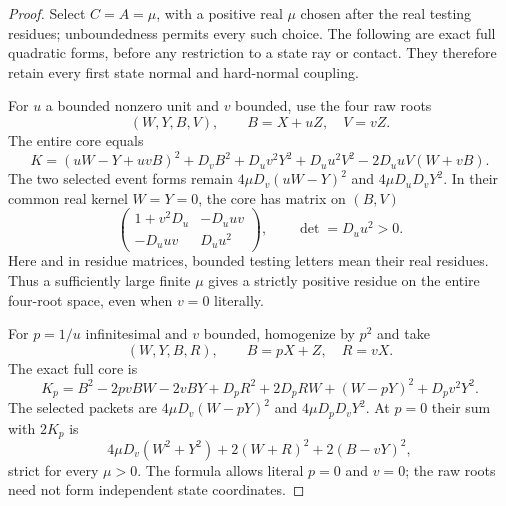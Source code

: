 \begin{proof}
Select $C=A=\mu$, with a positive real $\mu$ chosen after the real testing
residues; unboundedness permits every such choice. The following are exact
full quadratic forms, before any restriction to a state ray or contact.
They therefore retain every first state normal and hard-normal coupling.

For $u$ a bounded nonzero unit and $v$ bounded, use the four raw roots
\[
 (W,Y,B,V),\qquad B=X+uZ,\quad V=vZ.
\]
The entire core equals
\[
 K=(uW-Y+uvB)^2+D_vB^2+D_uv^2Y^2+D_uu^2V^2
       -2D_uuV(W+vB).                         \tag{CE2}
\]
The two selected event forms remain $4\mu D_v(uW-Y)^2$ and
$4\mu D_uD_vY^2$. In their common real kernel $W=Y=0$, the core has
matrix on $(B,V)$
\[
 \begin{pmatrix}1+v^2D_u&-D_uuv\\-D_uuv&D_uu^2\end{pmatrix},
 \qquad \det=D_uu^2>0.                       \tag{CE3}
\]
Here and in residue matrices, bounded testing letters mean their real
residues. Thus a sufficiently large finite $\mu$ gives a strictly positive
residue on the entire four-root space, even when $v=0$ literally.

For $p=1/u$ infinitesimal and $v$ bounded, homogenize by $p^2$ and take
\[
 (W,Y,B,R),\qquad B=pX+Z,\quad R=vX.
\]
The exact full core is
\[
 K_p=B^2-2pvBW-2vBY+D_pR^2+2D_pRW
                  +(W-pY)^2+D_pv^2Y^2.       \tag{CE4}
\]
The selected packets are $4\mu D_v(W-pY)^2$ and
$4\mu D_pD_vY^2$. At $p=0$ their sum with $2K_p$ is
\[
 4\mu D_v(W^2+Y^2)+2(W+R)^2+2(B-vY)^2,       \tag{CE5}
\]
strict for every $\mu>0$. The formula allows literal $p=0$ and $v=0$;
the raw roots need not form independent state coordinates.


\end{proof}

